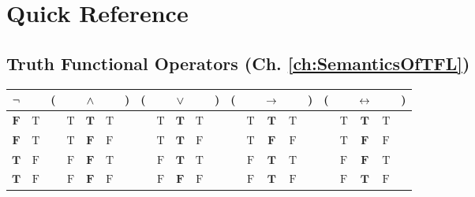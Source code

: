 \chapter[Quick Reference]{Quick Reference}
\section*{Truth Functional Operators (Ch. \ref{ch:SemanticsOfTFL})}


\begin{center}
\begin{tabular}{c@{ }@{ }c | c@{}@{ }c@{ }@{ }c@{ }@{ }c@{ }@{}c@{ } | c@{}@{ }c@{ }@{ }c@{ }@{ }c@{ }@{}c@{ } | c@{}@{ }c@{ }@{ }c@{ }@{ }c@{ }@{}c@{ } | c@{}@{ }c@{ }@{ }c@{ }@{ }c@{ }@{}c@{ }}
$\neg$ & \meta{\varphi} & ( & \meta{\varphi} & $\wedge $ & \meta{\psi} & ) & ( & \meta{\varphi} & $\vee$ & \meta{\psi} & ) & ( & \meta{\varphi} & $\rightarrow$ & \meta{\psi} & ) & ( & \meta{\varphi} & $\leftrightarrow$ & \meta{\psi} & )\\
\hline
$\textbf{F}$ & $\text{T}$ &  & $\text{T}$ & $\textbf{T}$ & $\text{T}$ &  &  & $\text{T}$ & $\textbf{T}$ & $\text{T}$ &  &  & $\text{T}$ & $\textbf{T}$ & $\text{T}$ &  &  & $\text{T}$ & $\textbf{T}$ & $\text{T}$ & \\
$\textbf{F}$ & $\text{T}$ &  & $\text{T}$ & $\textbf{F}$ & $\text{F}$ &  &  & $\text{T}$ & $\textbf{T}$ & $\text{F}$ &  &  & $\text{T}$ & $\textbf{F}$ & $\text{F}$ &  &  & $\text{T}$ & $\textbf{F}$ & $\text{F}$ & \\
$\textbf{T}$ & $\text{F}$ &  & $\text{F}$ & $\textbf{F}$ & $\text{T}$ &  &  & $\text{F}$ & $\textbf{T}$ & $\text{T}$ &  &  & $\text{F}$ & $\textbf{T}$ & $\text{T}$ &  &  & $\text{F}$ & $\textbf{F}$ & $\text{T}$ & \\
$\textbf{T}$ & $\text{F}$ &  & $\text{F}$ & $\textbf{F}$ & $\text{F}$ &  &  & $\text{F}$ & $\textbf{F}$ & $\text{F}$ &  &  & $\text{F}$ & $\textbf{T}$ & $\text{F}$ &  &  & $\text{F}$ & $\textbf{T}$ & $\text{F}$ & \\
\end{tabular}
\end{center}



